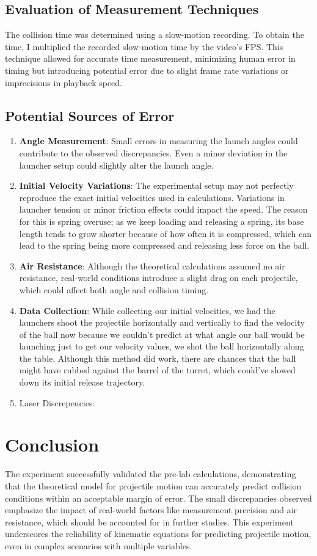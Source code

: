 \documentclass[12pt]{article}
\begin{document}
\subsection{Evaluation of Measurement Techniques}
The collision time was determined using a slow-motion recording. To obtain the time, I multiplied the recorded slow-motion time by the video's FPS. This technique allowed for accurate time measurement, minimizing human error in timing but introducing potential error due to slight frame rate variations or imprecisions in playback speed.

\subsection{Potential Sources of Error}
\begin{enumerate}
    \item \textbf{Angle Measurement}: Small errors in measuring the launch angles could contribute to the observed discrepancies. Even a minor deviation in the launcher setup could slightly alter the launch angle.
    \item \textbf{Initial Velocity Variations}: The experimental setup may not perfectly reproduce the exact initial velocities used in calculations. Variations in launcher tension or minor friction effects could impact the speed. The reason for this is spring overuse; as we keep loading and releasing a spring, its base length tends to grow shorter because of how often it is compressed, which can lead to the spring being more compressed and releasing less force on the ball.

    \item \textbf{Air Resistance}: Although the theoretical calculations assumed no air resistance, real-world conditions introduce a slight drag on each projectile, which could affect both angle and collision timing.
    \item \textbf{Data Collection}: While collecting our initial velocities, we had the launchers shoot the projectile horizontally and vertically to find the velocity of the ball now because we couldn't predict at what angle our ball would be launching just to get our velocity values, we shot the ball horizontally along the table. Although this method did work, there are chances that the ball might have rubbed against the barrel of the turret, which could've slowed down its initial release trajectory. 
    \item Laser Discrepencies: 
\end{enumerate}

\section{Conclusion}
The experiment successfully validated the pre-lab calculations, demonstrating that the theoretical model for projectile motion can accurately predict collision conditions within an acceptable margin of error. The small discrepancies observed emphasize the impact of real-world factors like measurement precision and air resistance, which should be accounted for in further studies. This experiment underscores the reliability of kinematic equations for predicting projectile motion, even in complex scenarios with multiple variables.
\end{document}
